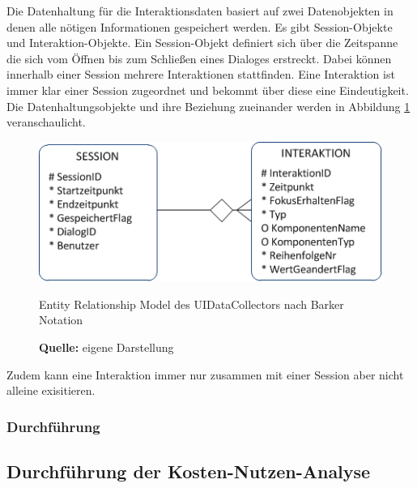 Die Datenhaltung für die Interaktionsdaten basiert auf zwei Datenobjekten in denen alle nötigen Informationen gespeichert werden. Es gibt Session-Objekte und Interaktion-Objekte. Ein Session-Objekt definiert sich über die Zeitspanne die sich vom Öffnen bis zum Schließen eines Dialoges erstreckt. Dabei können innerhalb einer Session mehrere Interaktionen stattfinden. Eine Interaktion ist immer klar einer Session zugeordnet und bekommt über diese eine Eindeutigkeit. Die Datenhaltungsobjekte und ihre Beziehung zueinander werden in Abbildung \ref{fig:ermUIDataCollector} veranschaulicht.
\begin{figure}[H]
  \centering
  \includegraphics[]{img/ERM_UIDataCollector.PNG}
  \caption{Entity Relationship Model des UIDataCollectors nach Barker Notation \citep[vgl.][]{Inguanez2012}}
  \label{fig:ermUIDataCollector}
  \caption*{\textbf{Quelle:} eigene Darstellung}
\end{figure}
Zudem kann eine Interaktion immer nur zusammen mit einer Session aber nicht alleine exisitieren.



\subsubsection{Durchführung}

\subsection{Durchführung der Kosten-Nutzen-Analyse}
